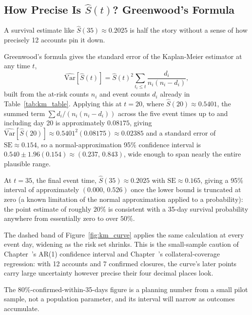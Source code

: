 \documentclass[../ai_in_finance]{subfiles}
\begin{document}
\subsection{How Precise Is $\hat S(t)$? Greenwood's Formula}
\label{sec:greenwood}

A survival estimate like $\hat S(35)\approx0.2025$ is half the story without a sense of how precisely 12 accounts pin it down.

Greenwood's formula gives the standard error of the Kaplan-Meier estimator at any time $t$,
\begin{equation}
\widehat{\text{Var}}[\hat S(t)] = \hat S(t)^2 \sum_{t_i \le t} \frac{d_i}{n_i(n_i-d_i)},
\label{eq:fraud-greenwood}
\end{equation}
built from the at-risk counts $n_i$ and event counts $d_i$ already in Table~\ref{tab:km_table}. Applying this at $t=20$, where $\hat S(20)\approx0.5401$, the summed term $\sum d_i/(n_i(n_i-d_i))$ across the five event times up to and including day 20 is approximately $0.08175$, giving $\widehat{\text{Var}}[\hat S(20)] \approx 0.5401^2(0.08175) \approx 0.02385$ and a standard error of $\text{SE}\approx0.154$, so a normal-approximation 95\% confidence interval is $0.540\pm1.96(0.154)\approx(0.237,\,0.843)$, wide enough to span nearly the entire plausible range.

At $t=35$, the final event time, $\hat S(35)\approx0.2025$ with $\text{SE}\approx0.165$, giving a 95\% interval of approximately $(0.000,\,0.526)$ once the lower bound is truncated at zero (a known limitation of the normal approximation applied to a probability): the point estimate of roughly $20\%$ is consistent with a 35-day survival probability anywhere from essentially zero to over $50\%$.

The dashed band of Figure~\ref{fig:km_curve} applies the same calculation at every event day, widening as the risk set shrinks. This is the small-sample caution of Chapter~'s AR(1) confidence interval and Chapter~'s collateral-coverage regression: with 12 accounts and 7 confirmed closures, the curve's later points carry large uncertainty however precise their four decimal places look.

The $80\%$-confirmed-within-35-days figure is a planning number from a small pilot sample, not a population parameter, and its interval will narrow as outcomes accumulate.
\end{document}
